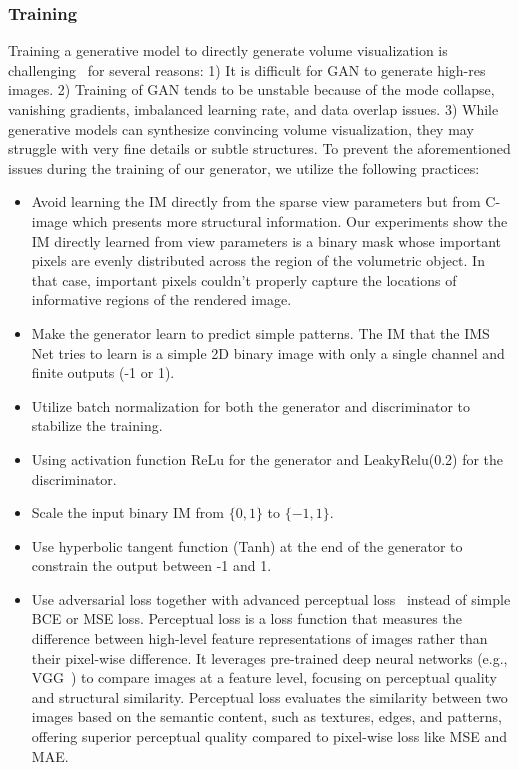 \subsubsection{Training}
Training a generative model to directly generate volume visualization is challenging~\cite{8316963, 10.5555/3157096.3157346, Zhang_2017_ICCV, brock2018large, pmlr-v70-arjovsky17a} for several reasons: 1) It is difficult for GAN to generate high-res images. 2) Training of GAN tends to be unstable because of the mode collapse, vanishing gradients, imbalanced learning rate, and data overlap issues. 3) While generative models can synthesize convincing volume visualization, they may struggle with very fine details or subtle structures. To prevent the aforementioned issues during the training of our generator, we utilize the following practices:
\begin{itemize}[leftmargin=*]
  \item Avoid learning the IM directly from the sparse view parameters but from C-image which presents more structural information. Our experiments show the IM directly learned from view parameters is a binary mask whose important pixels are evenly distributed across the region of the volumetric object. In that case, important pixels couldn't properly capture the locations of informative regions of the rendered image.
  \item Make the generator learn to predict simple patterns. The IM that the IMS Net tries to learn is a simple 2D binary image with only a single channel and finite outputs (-1 or 1).
  \item Utilize batch normalization for both the generator and discriminator to stabilize the training.
  \item Using activation function ReLu for the generator and LeakyRelu(0.2) for the discriminator.
  \item Scale the input binary IM from $\{0, 1\}$ to $\{-1, 1\}$.
  \item Use hyperbolic tangent function (Tanh) at the end of the generator to constrain the output between -1 and 1.
  \item Use adversarial loss together with advanced perceptual loss~\cite{10.1007/978-3-319-46475-6_43} instead of simple BCE or MSE loss. Perceptual loss is a loss function that measures the difference between high-level feature representations of images rather than their pixel-wise difference. It leverages pre-trained deep neural networks (e.g., VGG~\cite{simonyan2014very}) to compare images at a feature level, focusing on perceptual quality and structural similarity. Perceptual loss evaluates the similarity between two images based on the semantic content, such as textures, edges, and patterns, offering superior perceptual quality compared to pixel-wise loss like MSE and MAE.
\end{itemize}

